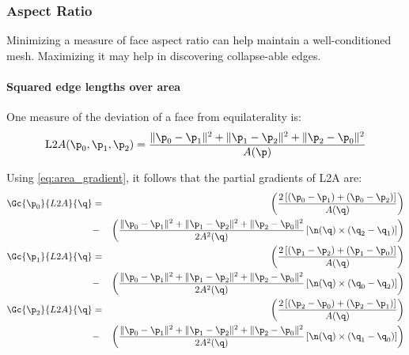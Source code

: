 
\subsubsection{Aspect Ratio}
\label{sec:aspect_ratio}

Minimizing a measure of face aspect ratio can help maintain
a well-conditioned mesh.
Maximizing it may help in discovering collapse-able edges.


\paragraph{Squared edge lengths over area}
\label{sec:Squared-edge-lengths-over-area}

One measure of the deviation of a face from equilaterality is:
\begin{equation}
{\mathrm L2A}(\p_0,\p_1,\p_2)
=
\frac{ \| \p_0 - \p_1 \|^2 + \| \p_1 - \p_2 \|^2 + \| \p_2 - \p_0 \|^2 }
{A(\p)}
\end{equation}

Using \ref{eq:area_gradient}, it follows that the
partial gradients of L2A are:
\begin{eqnarray}
\label{eq:L2A_gradient}
\Gc{\p_0}{L2A}{\q}
& =
&
\left(
\frac{2\left[ \left( \p_0 - \p_1 \right) + \left( \p_0 - \p_2 \right) \right]}
{A(\q)}
\right)
\\
& - &
\left(
\frac{ \| \p_0 - \p_1 \|^2 + \| \p_1 - \p_2 \|^2 + \| \p_2 - \p_0 \|^2 }
{2 A^2(\q)}
\left[ \n(\q) \times (\q_2 - \q_1)
\right]
\right)
\nonumber \\
\Gc{\p_1}{L2A}{\q}
& =
&
\left(
\frac{2\left[ \left( \p_1 - \p_2 \right) + \left( \p_1 - \p_0 \right) \right]}
{A(\q)}
\right)
\nonumber
\\
& - &
\left(
\frac{ \| \p_0 - \p_1 \|^2 + \| \p_1 - \p_2 \|^2 + \| \p_2 - \p_0 \|^2 }
{2 A^2(\q)}
\left[ \n(\q) \times (\q_0 - \q_2) \right]
\right)
\nonumber
\\
\Gc{\p_2}{L2A}{\q}
& =
&
\left(
\frac{2\left[ \left( \p_2 - \p_0 \right) + \left( \p_2 - \p_1 \right) \right]}
{A(\q)}
\right)
\nonumber
\\
& - &
\left(
\frac{ \| \p_0 - \p_1 \|^2 + \| \p_1 - \p_2 \|^2 + \| \p_2 - \p_0 \|^2 }
{2 A^2(\q)}
\left[ \n(\q) \times (\q_1 - \q_0) \right]
\right)
\nonumber
\end{eqnarray}
